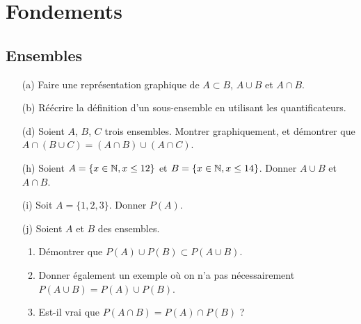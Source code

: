 \section{Fondements}

\subsection{Ensembles}
\begin{itemize}
    \item [(a)] Faire une représentation graphique de $A \subset B$, $A \cup B$ et $A \cap B$.
    \item [(b)] Réécrire la définition d'un sous-ensemble en utilisant les quantificateurs.
    \item [(d)] Soient $A$, $B$, $C$ trois ensembles. Montrer graphiquement, et démontrer que $A \cap (B \cup C) = (A\cap B)\cup(A\cap C)$.
    \item [(h)] Soient $A = \{x\in\mathbb{N}, x \leq 12 \}$ et $B = \{x\in\mathbb{N}, x \leq 14 \}$. Donner $A \cup B$ et $A \cap B$.
    \item [(i)] Soit $A = \{1, 2, 3 \}$. Donner $P(A)$.
    \item [(j)] Soient $A$ et $B$ des ensembles.
        \begin{enumerate}[label=(\roman*)]
            \item Démontrer que $P(A) \cup P(B) \subset P(A \cup B)$.
            \item Donner également un exemple où on n'a pas nécessairement $P(A \cup B) = P(A) \cup P(B)$.
            \item Est-il vrai que $P(A \cap B) = P(A) \cap P(B)$ ?
        \end{enumerate}
\end{itemize}

